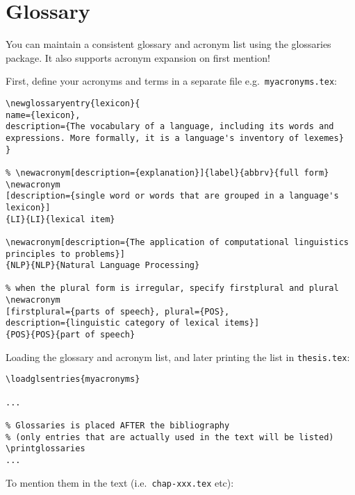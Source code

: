 \section{Glossary}\label{sec:glossary}
You can maintain a consistent glossary and acronym list using the \textsf{glossaries} package. It also supports acronym expansion on first mention! 

First, define your acronyms and terms in a separate file e.g.~\texttt{myacronyms.tex}:

\medskip

\begin{lstlisting}[moretexcs={newacronym,newglossaryentry},basicstyle=\ttfamily\small,
emph={name,description,plural,firstplural},emphstyle=\bfseries]
% \newglossaryentry{label}{name={term},description={explanation}}
\newglossaryentry{lexicon}{
name={lexicon},
description={The vocabulary of a language, including its words and expressions. More formally, it is a language's inventory of lexemes}
}

% \newacronym[description={explanation}]{label}{abbrv}{full form}
\newacronym
[description={single word or words that are grouped in a language's lexicon}]
{LI}{LI}{lexical item}

\newacronym[description={The application of computational linguistics principles to problems}]
{NLP}{NLP}{Natural Language Processing}

% when the plural form is irregular, specify firstplural and plural
\newacronym
[firstplural={parts of speech}, plural={POS},
description={linguistic category of lexical items}]
{POS}{POS}{part of speech}
\end{lstlisting}

\bigskip

Loading the glossary and acronym list, and later printing the list in \texttt{thesis.tex}:

\medskip

\begin{lstlisting}[moretexcs={loadglsentries,printglossaries}]
% Must be loaded BEFORE !
\loadglsentries{myacronyms}

...

% Glossaries is placed AFTER the bibliography
% (only entries that are actually used in the text will be listed)
\printglossaries
...
\end{lstlisting}

\bigskip

To mention them in the text (i.e.~\texttt{chap-xxx.tex} etc):

\medskip

